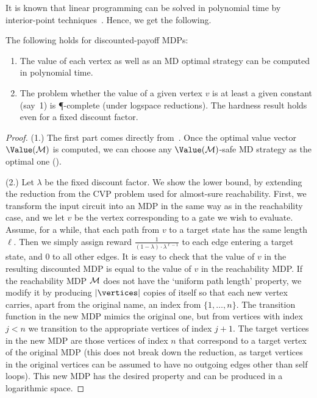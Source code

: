 It is known that linear programming can be solved in polynomial time by 
interior-point techniques~\cite{Khachiyan:1979,Karmarkar:1984}. Hence, we get the following.

\begin{theorem}
\label{5-thm:disc-polytime-lp}
The following holds for discounted-payoff MDPs:
\begin{enumerate}
\item The value of each vertex as well as an MD optimal 
strategy can be computed in polynomial time. 
\item The problem whether the value of a given vertex $v$ is at least a given constant 
(say~1) is \P-complete (under logspace reductions). The hardness result holds 
even for a fixed discount factor.
\end{enumerate}
\end{theorem}
\begin{proof}(1.)
The first part comes directly from~. Once the optimal value 
vector $\Value(\mdp)$ is computed, we can choose any $\Value(\mdp)$-safe MD 
strategy as the optimal one 
().

(2.) Let $\lambda$ be the fixed discount factor. We show the lower 
bound, by extending the reduction 
from the CVP problem used for almost-sure reachability. First, we 
transform the input circuit into an MDP in the same way as in the reachability 
case, and we let $v$ be the vertex corresponding to a gate we wish to evaluate. 
Assume, for a while, that each path from $v$ to a target state has the same 
length $\ell$. Then we simply assign reward 
$\frac{1}{(1-\lambda)\cdot\lambda^{\ell -1}}$ to each edge 
entering a target state, and $0$ to all other edges. It is easy to check that 
the value of $v$ in the resulting discounted MDP is equal to the value of $v$ 
in the reachability MDP. If the reachability MDP $\mathcal{M}$ does not have the 
`uniform 
path length' property, we modify it by producing $|\vertices|$ copies of 
itself so that each new vertex carries, apart from the original name, an index 
from $\{1,\dots,n\}$. The transition function in the new MDP mimics the 
original one, but from vertices with index $j<n$ we transition to the 
appropriate vertices of index $j+1$. The target vertices in the new MDP are 
those vertices of index $n$ that correspond to a target vertex of the 
original MDP (this does not break down the reduction, as target vertices in the original vertices can be assumed to have no outgoing edges other than self loops). This new MDP has the desired property and can be produced in a 
logarithmic space.
\end{proof}

